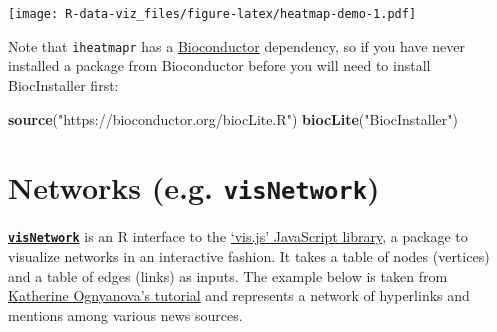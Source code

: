 \documentclass[]{book}
\newenvironment{Shaded}{\begin{snugshade}}{\end{snugshade}}
\newcommand{\KeywordTok}[1]{\textcolor[rgb]{0.13,0.29,0.53}{\textbf{#1}}}
\newcommand{\StringTok}[1]{\textcolor[rgb]{0.31,0.60,0.02}{#1}}
\newcommand{\NormalTok}[1]{#1}
\theoremstyle{definition}
\theoremstyle{definition}
\theoremstyle{definition}
\theoremstyle{remark}
\begin{document}
\texttt{[image: R-data-viz\_files/figure-latex/heatmap-demo-1.pdf]}

Note that \texttt{iheatmapr} has a
\href{https://bioconductor.org}{Bioconductor} dependency, so if you have
never installed a package from Bioconductor before you will need to
install BiocInstaller first:

\begin{Shaded}
\begin{Highlighting}[]
\KeywordTok{source}\NormalTok{(}\StringTok{"https://bioconductor.org/biocLite.R"}\NormalTok{)}
\KeywordTok{biocLite}\NormalTok{(}\StringTok{"BiocInstaller"}\NormalTok{)}
\end{Highlighting}
\end{Shaded}

\section{\texorpdfstring{Networks (e.g.
\textbf{\texttt{visNetwork}})}{Networks (e.g. visNetwork)}}\label{networks-e.g.-visnetwork}

\href{https://CRAN.R-project.org/package=visNetwork}{\textbf{\texttt{visNetwork}}}
is an R interface to the \href{http://visjs.org/}{`vis.js' JavaScript
library}, a package to visualize networks in an interactive fashion. It
takes a table of nodes (vertices) and a table of edges (links) as
inputs. The example below is taken from
\href{http://kateto.net/network-visualization}{Katherine Ognyanova's
tutorial} and represents a network of hyperlinks and mentions among
various news sources.
\end{document}
